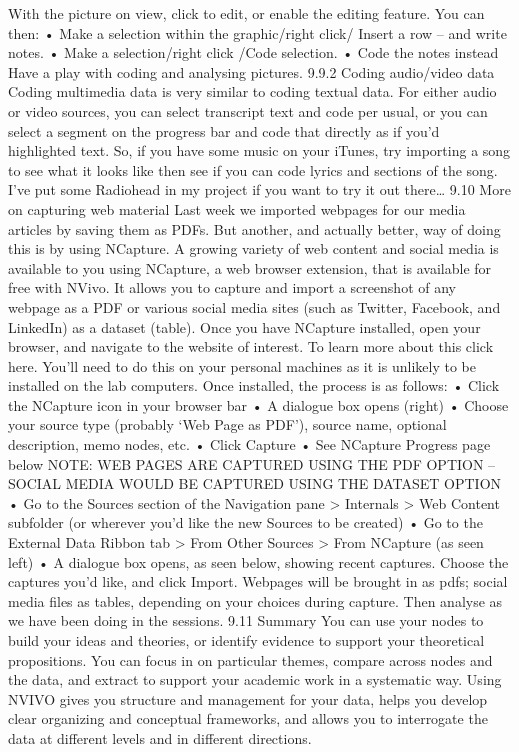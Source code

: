 \documentclass[
]{book}
\begin{document}
With the picture on view, click to edit, or enable the editing feature. You can then:
• Make a selection within the graphic/right click/ Insert a row -- and write notes.
• Make a selection/right click /Code selection.
• Code the notes instead
Have a play with coding and analysing pictures.
9.9.2 Coding audio/video data
Coding multimedia data is very similar to coding textual data. For either audio or video sources, you can select transcript text and code per usual, or you can select a segment on the progress bar and code that directly as if you'd highlighted text.
So, if you have some music on your iTunes, try importing a song to see what it looks like then see if you can code lyrics and sections of the song. I've put some Radiohead in my project if you want to try it out there\ldots{}
9.10 More on capturing web material
Last week we imported webpages for our media articles by saving them as PDFs. But another, and actually better, way of doing this is by using NCapture.
A growing variety of web content and social media is available to you using NCapture, a web browser extension, that is available for free with NVivo. It allows you to capture and import a screenshot of any webpage as a PDF or various social media sites (such as Twitter, Facebook, and LinkedIn) as a dataset (table). Once you have NCapture installed, open your browser, and navigate to the website of interest.
To learn more about this click here.
You'll need to do this on your personal machines as it is unlikely to be installed on the lab computers.
Once installed, the process is as follows:
• Click the NCapture icon in your browser bar
• A dialogue box opens (right)
• Choose your source type (probably `Web Page as PDF'), source name, optional description, memo nodes, etc.
• Click Capture
• See NCapture Progress page below
NOTE: WEB PAGES ARE CAPTURED USING THE PDF OPTION -- SOCIAL MEDIA WOULD BE CAPTURED USING THE DATASET OPTION
• Go to the Sources section of the Navigation pane \textgreater{} Internals \textgreater{} Web Content subfolder (or wherever you'd like the new Sources to be created)
• Go to the External Data Ribbon tab \textgreater{} From Other Sources \textgreater{} From NCapture (as seen left)
• A dialogue box opens, as seen below, showing recent captures. Choose the captures you'd like, and click Import. Webpages will be brought in as pdfs; social media files as tables, depending on your choices during capture.
Then analyse as we have been doing in the sessions.
9.11 Summary
You can use your nodes to build your ideas and theories, or identify evidence to support your theoretical propositions. You can focus in on particular themes, compare across nodes and the data, and extract to support your academic work in a systematic way. Using NVIVO gives you structure and management for your data, helps you develop clear organizing and conceptual frameworks, and allows you to interrogate the data at different levels and in different directions.

  
\end{document}

